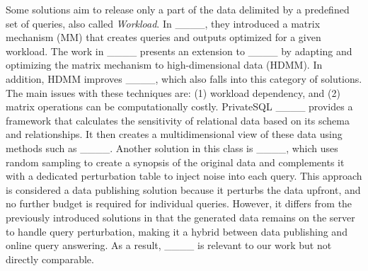 \medskip

Some solutions aim to release only a part of the data delimited by a predefined set of queries, also called \textit{Workload}. In ____, they introduced a matrix mechanism (MM) that creates queries and outputs optimized for a given workload. The work in ____ presents an extension to ____ by adapting and optimizing the matrix mechanism to high-dimensional data (HDMM). 
In addition, HDMM improves ____, which also falls into this category of solutions. 
The main issues with these techniques are: (1) workload dependency, and (2) matrix operations can be computationally costly.
PrivateSQL ____ provides a framework that calculates the sensitivity of relational data based on its schema and relationships. It then creates a multidimensional view of these data using methods such as ____.
Another solution in this class is ____, which uses random sampling to create a synopsis of the original data and complements it with a dedicated perturbation table to inject noise into each query. This approach is considered a data publishing solution because it perturbs the data upfront, and no further budget is required for individual queries. However, it differs from the previously introduced solutions in that the generated data remains on the server to handle query perturbation, making it a hybrid between data publishing and online query answering. As a result, ____ is relevant to our work but not directly comparable.
\medskip

